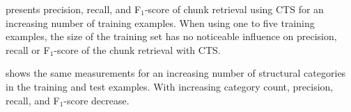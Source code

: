  presents precision,
recall, and F$_{1}$-score of chunk retrieval using CTS for an
increasing number of training examples.
When using one to five
training examples, the size of the training set has no noticeable
influence on precision, recall or F$_{1}$-score of the chunk retrieval
with CTS.

 shows the same
measurements for an increasing number of structural categories in the
training and test examples.
With increasing category count, precision,
recall, and F$_{1}$-score decrease.

